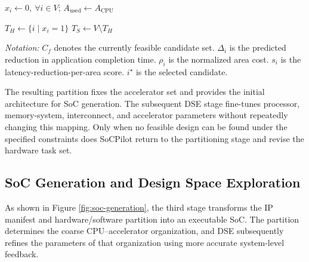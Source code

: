 \begin{algorithm}
\caption{Hardware/Software Partitioning}
\label{alg:hw-sw-partitioning}

$x_i\leftarrow 0,\ \forall i\in V$; 
$A_{\mathrm{used}}\leftarrow A_{\mathrm{CPU}}$\;


$T_H\leftarrow\{i\mid x_i=1\}$\;
$T_S\leftarrow V\setminus T_H$\;


\vspace{0.4em}
{\footnotesize
\textit{Notation:}
$C_f$ denotes the currently feasible candidate set.
$\Delta_i$ is the predicted reduction in application completion time.
$\rho_i$ is the normalized area cost.
$s_i$ is the latency-reduction-per-area score.
$i^\star$ is the selected candidate.
}

\end{algorithm}


The resulting partition fixes the accelerator set and provides the initial architecture for SoC generation. The subsequent DSE stage fine-tunes processor, memory-system, interconnect, and accelerator parameters without repeatedly changing this mapping. Only when no feasible design can be found under the specified constraints does SoCPilot return to the partitioning stage and revise the hardware task set.

\subsection{SoC Generation and Design Space Exploration}\label{sec:soc-generation}
As shown in Figure \ref{fig:soc-generation}, the third stage transforms the IP manifest and hardware/software partition into an executable SoC. The partition determines the coarse CPU--accelerator organization, and DSE subsequently refines the parameters of that organization using more accurate system-level feedback.

